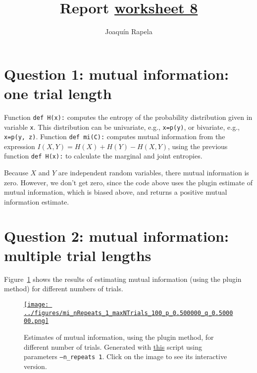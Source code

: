 \documentclass[12pt]{article}
\title{Report
\href{https://colab.research.google.com/drive/152sfMIzyTA-NesY-WoYqPdU_R8-bHAm7?usp=sharing}{worksheet 8}}
\author{Joaqu\'{i}n Rapela}
\begin{document}
\maketitle

\section*{Question 1: mutual information: one trial length}

Function \texttt{def H(x):} computes the entropy of the probability
distribution given in variable \texttt{x}. This distribution can be univariate,
e.g., \texttt{x=p(y)}, or bivariate, e.g., \texttt{x=p(y, z)}. Function
\texttt{def mi(C):} computes mutual information from the expression $I(X,
Y)=H(X)+H(Y)-H(X,Y)$, using the previous function \texttt{def H(x):} to
calculate the marginal and joint entropies.

Because $X$ and $Y$ are independent random variables, there mutual information
is zero. However, we don't get zero, since the code above uses the plugin
estimate of mutual information, which is biased above, and returns a positive
mutual information estimate.

\section*{Question 2: mutual information: multiple trial lengths}

Figure~\ref{fig:miEstimatesMultiTrial} shows the results of estimating mutual
information (using the plugin method) for different numbers of trials.

\begin{figure}[H]
    \begin{center}
        \href{https://www.gatsby.ucl.ac.uk/~rapela/neuroinformatics/2023/ws8/figures/mi_nRepeats_1_maxNTrials_100_p_0.500000_q_0.500000.html}{\texttt{[image: ../figures/mi\_nRepeats\_1\_maxNTrials\_100\_p\_0.500000\_q\_0.500000.png]}}

        \caption{Estimates of mutual information, using the plugin method, for different number of trials.
        Generated with
        \href{https://github.com/joacorapela/neuroinformatics23/blob/master/worksheets/ws8/mySolution/code/scripts/doEstimateMI_multiTrials.py}{this}
        script using parameters \texttt{--n\_repeats 1}. Click on the image to see its
        interactive version.}

        \label{fig:miEstimatesMultiTrial}
    \end{center}
\end{figure}
\end{document}
